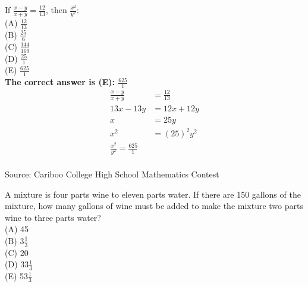 \documentclass{article}
\begin{document}
\normalsize
If $\frac{x-y}{x+y}=\frac{12}{13}$, then $\frac{x^2}{y^2}$:\\
(A) $\frac{12}{13}$\\[1 ex]
(B) $\frac{25}{6}$\\[1 ex]
(C) $\frac{144}{169}$\\[1 ex]
(D) $\frac{25}{1}$\\[1 ex]
(E) $\frac{625}{1}$\\


\textbf{The correct answer is (E): $\frac{625}{1}$}\\
\begin{align*}
\frac{x-y}{x+y}&=\frac{12}{13}\\
13x-13y&=12x+12y\\
x&=25y\\
x^{2}&=(25)^{2}y^2\\
\frac{x^2}{y^2}=\frac{625}{1}
\end{align*}
\\[5 ex]

\scriptsize
Source: Cariboo College High School Mathematics Contest

\normalsize
A mixture is four parts wine to eleven parts water. If there are 150 gallons of the mixture, how many gallons of wine must be added to make the mixture two parts wine to three parts water?\\
(A) 45\\
(B) 3$\frac{1}{3}$\\
(C) 20\\
(D) 33$\frac{1}{3}$\\
(E) 53$\frac{1}{3}$\\
\end{document}
